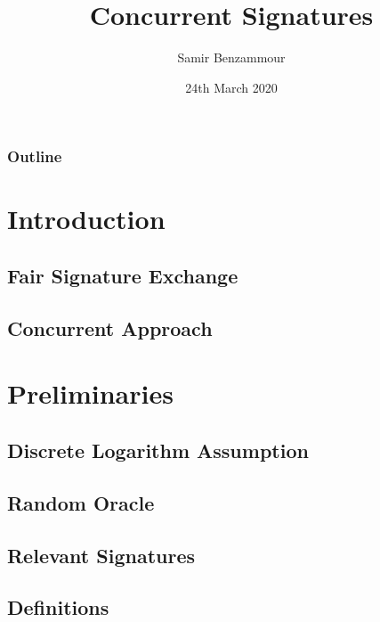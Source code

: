 \documentclass{beamer}
\title{Concurrent Signatures}
\author{Samir Benzammour}
\date{24th March 2020}
\institute[RWTH]{
  Algorithms and Computational Complexity\\
  RWTH Aachen University
}
\begin{document}
\frame{\titlepage}

\begin{frame}
	\frametitle{Outline}
	\tableofcontents
\end{frame}

\section{Introduction}
% 

\subsection{Fair Signature Exchange}
% 

\subsection{Concurrent Approach}
% 

\section{Preliminaries}
% 

\subsection{Discrete Logarithm Assumption}
% 

\subsection{Random Oracle}
% 

\subsection{Relevant Signatures}
% 

\subsection{Definitions}

\end{document}
